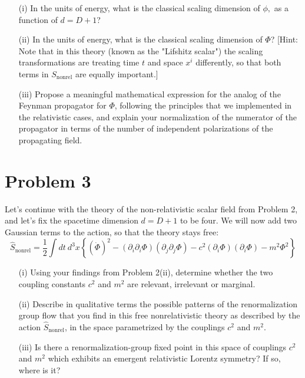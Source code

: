 \documentclass[12pt]{article}
\begin{document}
\begin{enumerate}
    \item[(i)] In the units of energy, what is the classical scaling dimension of $\phi,$ as a function of $d=D+1$?
    \item[(ii)] In the units of energy, what is the classical scaling dimension of $\Phi$? [Hint: Note that in this theory (known as the "Lifshitz scalar") the scaling transformations are treating time $t$ and space $x^{i}$ differently, so that both terms in $S_{\text{nonrel}}$ are equally important.]
    \item[(iii)] Propose a meaningful mathematical expression for the analog of the Feynman propagator for $\Phi$, following the principles that we implemented in the relativistic cases, and explain your normalization of the numerator of the propagator in terms of the number of independent polarizations of the propagating field.
\end{enumerate}

\section*{Problem 3}

Let's continue with the theory of the non-relativistic scalar field from Problem 2, and let's fix the spacetime dimension $d=D+1$ to be four. We will now add two Gaussian terms to the action, so that the theory stays free:
$$\hat{S}_{\text{nonrel}}=\frac{1}{2}\int dt~d^{3}x\left\{(\dot{\Phi})^{2}-(\partial_{i}\partial_{i}\Phi)(\partial_{j}\partial_{j}\Phi)-c^{2}(\partial_{i}\Phi)(\partial_{i}\Phi)-m^{2}\Phi^{2}\right\}$$

\begin{enumerate}
    \item[(i)] Using your findings from Problem 2(ii), determine whether the two coupling constants $c^{2}$ and $m^{2}$ are relevant, irrelevant or marginal.
    \item[(ii)] Describe in qualitative terms the possible patterns of the renormalization group flow that you find in this free nonrelativistic theory as described by the action $\hat{S}_{\text{nonrel}}$, in the space parametrized by the couplings $c^{2}$ and $m^{2}$.
    \item[(iii)] Is there a renormalization-group fixed point in this space of couplings $c^{2}$ and $m^{2}$ which exhibits an emergent relativistic Lorentz symmetry? If so, where is it?
\end{enumerate}
\end{document}
